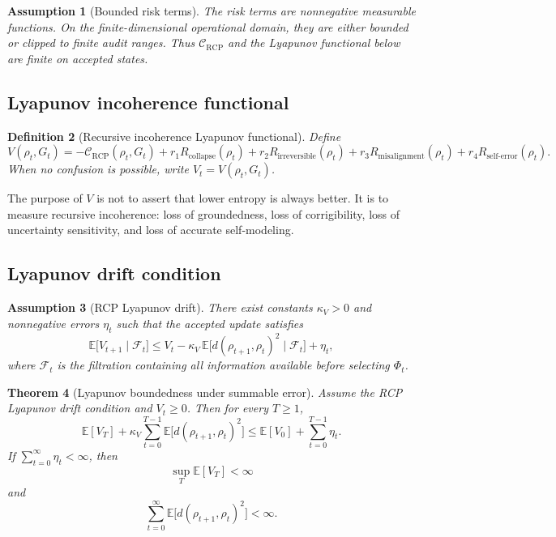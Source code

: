 \documentclass[11pt]{article}
\newtheorem{theorem}{Theorem}[section]
\newtheorem{definition}[theorem]{Definition}
\newtheorem{assumption}[theorem]{Assumption}
\newcommand{\Fcal}{\mathcal{F}}
\newcommand{\Ccal}{\mathcal{C}}
\newcommand{\1}{\mathbf{1}}
\newcommand{\RCP}{\mathrm{RCP}}
\begin{document}
\begin{assumption}[Bounded risk terms]
The risk terms are nonnegative measurable functions. On the finite-dimensional operational domain, they are either bounded or clipped to finite audit ranges. Thus \(\Ccal_{\RCP}\) and the Lyapunov functional below are finite on accepted states.
\end{assumption}

\subsection{Lyapunov incoherence functional}

\begin{definition}[Recursive incoherence Lyapunov functional]
Define
\[
V(\rho_t,G_t)
=
-\Ccal_{\RCP}(\rho_t,G_t)
+r_1R_{\mathrm{collapse}}(\rho_t)
+r_2R_{\mathrm{irreversible}}(\rho_t)
+r_3R_{\mathrm{misalignment}}(\rho_t)
+r_4R_{\mathrm{self\mbox{-}error}}(\rho_t).
\]
When no confusion is possible, write \(V_t=V(\rho_t,G_t)\).
\end{definition}

The purpose of \(V\) is not to assert that lower entropy is always better. It is to measure recursive incoherence: loss of groundedness, loss of corrigibility, loss of uncertainty sensitivity, and loss of accurate self-modeling.

\subsection{Lyapunov drift condition}

\begin{assumption}[RCP Lyapunov drift]
There exist constants \(\kappa_V>0\) and nonnegative errors \(\eta_t\) such that the accepted update satisfies
\[
\mathbb E\bigl[V_{t+1}\mid\Fcal_t\bigr]
\le
V_t
-
\kappa_V\,\mathbb E\bigl[d(\rho_{t+1},\rho_t)^2\mid\Fcal_t\bigr]
+
\eta_t,
\]
where \(\Fcal_t\) is the filtration containing all information available before selecting \(\Phi_t\).
\end{assumption}

\begin{theorem}[Lyapunov boundedness under summable error]
\label{thm:lyapunov_boundedness}
Assume the RCP Lyapunov drift condition and \(V_t\ge0\). Then for every \(T\ge1\),
\[
\mathbb E[V_T]
+
\kappa_V\sum_{t=0}^{T-1}\mathbb E\bigl[d(\rho_{t+1},\rho_t)^2\bigr]
\le
\mathbb E[V_0]
+
\sum_{t=0}^{T-1}\eta_t.
\]
If \(\sum_{t=0}^{\infty}\eta_t<\infty\), then
\[
\sup_T\mathbb E[V_T]<\infty
\]
and
\[
\sum_{t=0}^{\infty}\mathbb E\bigl[d(\rho_{t+1},\rho_t)^2\bigr]<\infty.
\]
\end{theorem}
\end{document}
